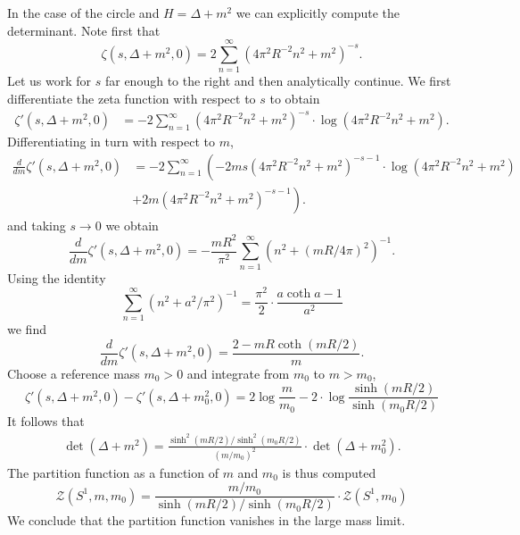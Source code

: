 \documentclass{amsart}
\begin{document}
In the case of the circle and $H=\Delta+m^2$ we can explicitly compute the determinant.
Note first that
\begin{equation*}
    \zeta(s,\Delta+m^2,0) = 2\sum_{n=1}^\infty (4\pi^2R^{-2}n^2+m^2)^{-s}.
\end{equation*}
Let us work for $s$ far enough to the right and then analytically continue.
We first differentiate the zeta function with respect to $s$ to obtain
\begin{align*}
    \zeta'(s,\Delta+m^2,0) &= -2\sum_{n=1}^\infty (4\pi^2R^{-2}n^2+m^2)^{-s}
    \cdot \log(4\pi^2R^{-2}n^2+m^2).
\end{align*}
Differentiating in turn with respect to $m$,
\begin{align*}
    \frac{d}{dm}\zeta'(s,\Delta+m^2,0) &= -2\sum_{n=1}^\infty\left(-2ms(4\pi^2R^{-2}n^2+m^2)^{-s-1}
        \cdot\log(4\pi^2R^{-2}n^2+m^2)\right.\\
        & \left. + 2m(4\pi^2R^{-2}n^2+m^2)^{-s-1} \right).
\end{align*}
and taking $s\to0$ we obtain
\begin{equation*}
    \frac{d}{dm}\zeta'(s,\Delta+m^2,0) = -\frac{mR^2}{\pi^2}\sum_{n=1}^\infty (n^2+(mR/4\pi)^2)^{-1}.
\end{equation*}
Using the identity
\begin{equation*}
    \sum_{n=1}^\infty (n^2+a^2/\pi^2)^{-1} = \frac{\pi^2}{2}\cdot \frac{a\coth a-1}{a^2}
\end{equation*}
we find
\begin{equation*}
    \frac{d}{dm}\zeta'(s,\Delta+m^2,0) = \frac{2- mR \coth(mR/2)}{m}.
\end{equation*}
Choose a reference mass $m_0>0$ and integrate from $m_0$ to $m>m_0$,
\begin{equation*}
    \zeta'(s,\Delta+m^2,0)-\zeta'(s,\Delta+m_0^2,0) = 2\log \frac{m}{m_0} - 2 \cdot \log\frac{\sinh(mR/2)}{\sinh(m_0R/2)}
\end{equation*}
It follows that
\begin{align*}
    \det(\Delta+m^2) = \frac{\sinh^2(mR/2)/\sinh^2(m_0R/2)}{(m/m_0)^2} \cdot \det(\Delta+m_0^2).
\end{align*}
The partition function as a function of $m$ and $m_0$ is thus computed
\begin{equation*}
    \mathcal{Z}(S^1,m,m_0) = \frac{m/m_0}{\sinh(mR/2)/\sinh(m_0R/2)}  \cdot \mathcal{Z}(S^1,m_0)
\end{equation*}
We conclude that the partition function vanishes in the large mass limit.
\end{document}
